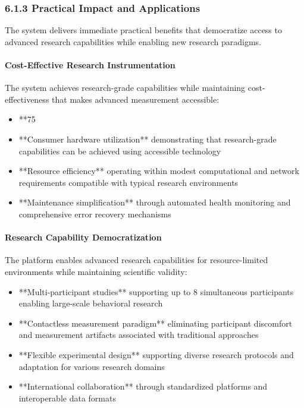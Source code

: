 \documentclass[11pt,a4paper]{article}
\begin{document}
\subsubsection{6.1.3 Practical Impact and Applications}

The system delivers immediate practical benefits that democratize access to advanced research capabilities while
enabling new research paradigms.

\paragraph{Cost-Effective Research Instrumentation}

The system achieves research-grade capabilities while maintaining cost-effectiveness that makes advanced measurement
accessible:

\begin{itemize}
\item **75%
\item **Consumer hardware utilization** demonstrating that research-grade capabilities can be achieved using accessible
  technology
\item **Resource efficiency** operating within modest computational and network requirements compatible with typical
  research environments
\item **Maintenance simplification** through automated health monitoring and comprehensive error recovery mechanisms

\end{itemize}
\paragraph{Research Capability Democratization}

The platform enables advanced research capabilities for resource-limited environments while maintaining scientific
validity:

\begin{itemize}
\item **Multi-participant studies** supporting up to 8 simultaneous participants enabling large-scale behavioral research
\item **Contactless measurement paradigm** eliminating participant discomfort and measurement artifacts associated with
  traditional approaches
\item **Flexible experimental design** supporting diverse research protocols and adaptation for various research domains
\item **International collaboration** through standardized platforms and interoperable data formats

\end{itemize}
\end{document}
